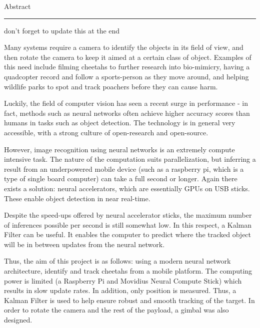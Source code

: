 {\Large Abstract}\\
\hrule

{\Large \color{red} don't forget to update this at the end}

Many systems require a camera to identify the objects in its field of view, and then rotate the camera to keep it aimed at a certain class of object. Examples of this need include filming cheetahs to further research into bio-mimicry, having a quadcopter record and follow a sports-person as they move around, and helping wildlife parks to spot and track poachers before they can cause harm.

Luckily, the field of computer vision has seen a recent surge in performance - in fact, methods such as neural networks often achieve higher accuracy scores than humans in tasks such as object detection. The technology is in general very accessible, with a strong culture of open-research and open-source.

However, image recognition using neural networks is an extremely compute intensive task. The nature of the computation suits parallelization, but inferring a result from an underpowered mobile device (such as a raspberry pi, which is a type of single board computer) can take a full second or longer. Again there exists a solution: neural accelerators, which are essentially GPUs on USB sticks. These enable object detection in near real-time.

Despite the speed-ups offered by neural accelerator sticks, the maximum number of inferences possible per second is still somewhat low. In this respect, a Kalman Filter can be useful. It enables the computer to predict where the tracked object will be in between updates from the neural network.

Thus, the aim of this project is as follows: using a modern neural network architecture, identify and track cheetahs from a mobile platform. The computing power is limited (a Raspberry Pi and Movidius Neural Compute Stick) which results in slow update rates. In addition, only position is measured. Thus, a Kalman Filter is used to help ensure robust and smooth tracking of the target. In order to rotate the camera and the rest of the payload, a gimbal was also designed.

\newpage
